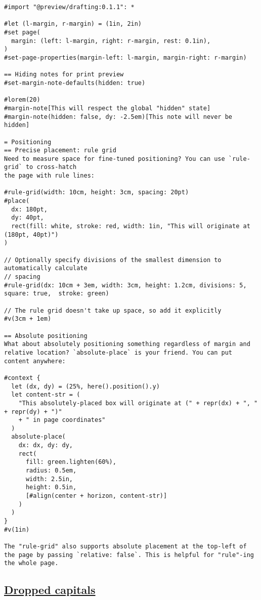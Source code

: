 \begin{verbatim}
#import "@preview/drafting:0.1.1": *

#let (l-margin, r-margin) = (1in, 2in)
#set page(
  margin: (left: l-margin, right: r-margin, rest: 0.1in),
)
#set-page-properties(margin-left: l-margin, margin-right: r-margin)

== Hiding notes for print preview
#set-margin-note-defaults(hidden: true)

#lorem(20)
#margin-note[This will respect the global "hidden" state]
#margin-note(hidden: false, dy: -2.5em)[This note will never be hidden]

= Positioning
== Precise placement: rule grid
Need to measure space for fine-tuned positioning? You can use `rule-grid` to cross-hatch
the page with rule lines:

#rule-grid(width: 10cm, height: 3cm, spacing: 20pt)
#place(
  dx: 180pt,
  dy: 40pt,
  rect(fill: white, stroke: red, width: 1in, "This will originate at (180pt, 40pt)")
)

// Optionally specify divisions of the smallest dimension to automatically calculate
// spacing
#rule-grid(dx: 10cm + 3em, width: 3cm, height: 1.2cm, divisions: 5, square: true,  stroke: green)

// The rule grid doesn't take up space, so add it explicitly
#v(3cm + 1em)

== Absolute positioning
What about absolutely positioning something regardless of margin and relative location? `absolute-place` is your friend. You can put content anywhere:

#context {
  let (dx, dy) = (25%, here().position().y)
  let content-str = (
    "This absolutely-placed box will originate at (" + repr(dx) + ", " + repr(dy) + ")"
    + " in page coordinates"
  )
  absolute-place(
    dx: dx, dy: dy,
    rect(
      fill: green.lighten(60%),
      radius: 0.5em,
      width: 2.5in,
      height: 0.5in,
      [#align(center + horizon, content-str)]
    )
  )
}
#v(1in)

The "rule-grid" also supports absolute placement at the top-left of the page by passing `relative: false`. This is helpful for "rule"-ing the whole page.
\end{verbatim}

\pandocbounded{}

\subsection{\texorpdfstring{\hyperref[dropped-capitals]{Dropped
capitals}}{Dropped capitals}}\label{dropped-capitals}

